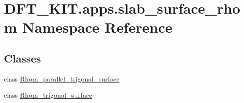\hypertarget{namespace_d_f_t___k_i_t_1_1apps_1_1slab__surface__rhom}{\section{D\+F\+T\+\_\+\+K\+I\+T.\+apps.\+slab\+\_\+surface\+\_\+rhom Namespace Reference}
\label{namespace_d_f_t___k_i_t_1_1apps_1_1slab__surface__rhom}
}
\subsection*{Classes}
\begin{DoxyCompactItemize}
\item 
class \hyperlink{class_d_f_t___k_i_t_1_1apps_1_1slab__surface__rhom_1_1_rhom__parallel__trigonal__surface}{Rhom\+\_\+parallel\+\_\+trigonal\+\_\+surface}
\item 
class \hyperlink{class_d_f_t___k_i_t_1_1apps_1_1slab__surface__rhom_1_1_rhom__trigonal__surface}{Rhom\+\_\+trigonal\+\_\+surface}
\end{DoxyCompactItemize}
